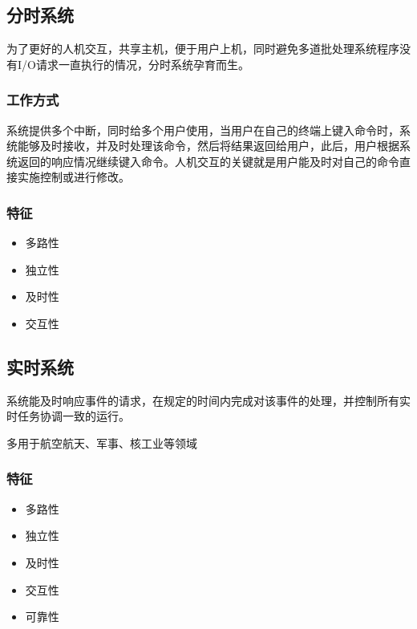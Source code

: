 \documentclass[]{scrartcl}
\begin{document}
	\subsection{分时系统}
	\quad
	
	为了更好的人机交互，共享主机，便于用户上机，同时避免多道批处理系统程序没有I/O请求一直执行的情况，分时系统孕育而生。
	
		\subsubsection{工作方式}
		系统提供多个中断，同时给多个用户使用，当用户在自己的终端上键入命令时，系统能够及时接收，并及时处理该命令，然后将结果返回给用户，此后，用户根据系统返回的响应情况继续键入命令。人机交互的关键就是用户能及时对自己的命令直接实施控制或进行修改。
		\subsubsection{特征}
		\begin{itemize}
			\item 多路性
			\item 独立性
			\item 及时性
			\item 交互性
		\end{itemize}
	\subsection{实时系统}
	\quad

	系统能及时响应事件的请求，在规定的时间内完成对该事件的处理，并控制所有实时任务协调一致的运行。
	
	多用于航空航天、军事、核工业等领域

		\subsubsection{特征}
		\begin{itemize}
			\item 多路性
			\item 独立性
			\item 及时性
			\item 交互性
			\item 可靠性
		\end{itemize}
\end{document}
